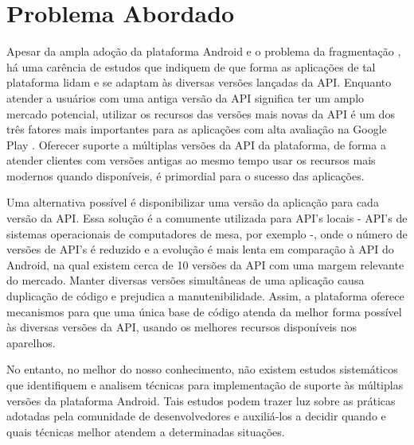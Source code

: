 \section{Problema Abordado} \label{sec:apresentacao-do-problema}

Apesar da ampla adoção da plataforma Android e o problema da fragmentação \cite{Park2013},
há uma carência de estudos que indiquem de que forma as aplicações de tal plataforma
lidam e se adaptam às diversas versões lançadas da API. 
Enquanto atender a usuários com uma antiga versão da API significa ter um amplo
mercado potencial, utilizar os recursos das versões mais novas da API é um dos três 
fatores mais importantes para as aplicações com alta avaliação na Google Play \cite{Tian2015}.
Oferecer suporte a múltiplas versões da API da plataforma, de forma a atender clientes
com versões antigas ao mesmo tempo usar os recursos mais modernos quando disponíveis,
é primordial para o sucesso das aplicações.

Uma alternativa possível é disponibilizar uma versão da aplicação para cada versão
da API. Essa solução é a comumente utilizada para API’s locais - API’s de sistemas
operacionais de computadores de mesa, por exemplo -, onde o número de versões de
API’s é reduzido e a evolução é mais lenta em comparação à API do Android, na qual
existem
cerca de 10 versões da API com uma margem relevante do mercado. Manter diversas
versões simultâneas de uma aplicação causa duplicação de código e prejudica a
manutenibilidade. %
Assim, a plataforma oferece mecanismos para que uma única base
de código atenda da melhor forma possível às diversas versões da API, usando os
melhores recursos disponíveis nos aparelhos.

No entanto, no melhor do nosso conhecimento, não existem estudos sistemáticos que
identifiquem e analisem técnicas para implementação de suporte às
múltiplas versões da plataforma Android. Tais estudos podem trazer luz sobre as
práticas adotadas pela comunidade de desenvolvedores e auxiliá-los a decidir
quando e quais técnicas melhor atendem a determinadas situações.

